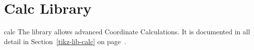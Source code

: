 
\section{Calc Library}

\begin{tikzlibrary}{calc}
    The library allows advanced Coordinate Calculations. It is documented in
    all detail in Section~\ref{tikz-lib-calc} on page~\pageref{tikz-lib-calc}.
\end{tikzlibrary}
